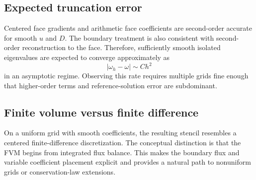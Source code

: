 \subsection{Expected truncation error}
Centered face gradients and arithmetic face coefficients are second-order accurate for smooth $u$ and $D$. The boundary treatment is also consistent with second-order reconstruction to the face. Therefore, sufficiently smooth isolated eigenvalues are expected to converge approximately as
\begin{equation}
|\omega_h-\omega|\sim Ch^2
\end{equation}
in an asymptotic regime. Observing this rate requires multiple grids fine enough that higher-order terms and reference-solution error are subdominant.

\subsection{Finite volume versus finite difference}
On a uniform grid with smooth coefficients, the resulting stencil resembles a centered finite-difference discretization. The conceptual distinction is that the FVM begins from integrated flux balance. This makes the boundary flux and variable coefficient placement explicit and provides a natural path to nonuniform grids or conservation-law extensions.
